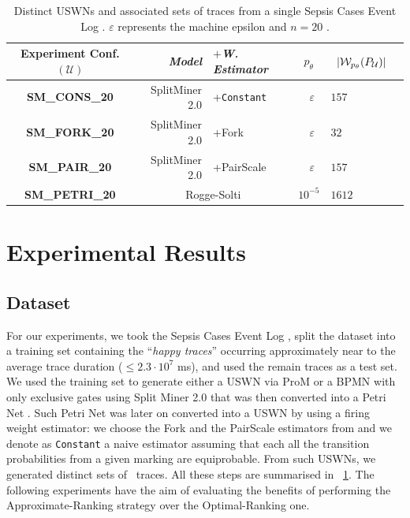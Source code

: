 \begin{table}[!t]
\caption{Distinct USWNs and associated sets of \unravelled traces from a single Sepsis Cases Event Log \cite{mannhardt_2016}. $\varepsilon$ represents the machine epsilon \ifdefined\WWITHN and $n=20$ \fi.}\label{tab:dataset}
 \begin{adjustbox}{max width=\textwidth}
	\begin{tabular}{crl||cl|c}
		\toprule
		\textbf{Experiment Conf.} $(\mathcal{U})$ & \textit{Model} & $+$\textit{W. Estimator} & $p_\theta$& $\;\;|\WCal{p_\theta}{n}(P_{\mathcal{U}})|$ \\
		\midrule
		
		\textbf{SM\_CONS\_20} &SplitMiner 2.0  \cite{AugustoCDRP19}       & +\texttt{Constant} &  $\;\;\varepsilon$ & $157$  \\
		
		\textbf{SM\_FORK\_20} & SplitMiner 2.0  \cite{AugustoCDRP19}      & +Fork \cite{spdwe} &  $\;\;\varepsilon$ & $32$  \\
		
		
		\textbf{SM\_PAIR\_20} & SplitMiner 2.0  \cite{AugustoCDRP19}      & +PairScale \cite{spdwe} &  $\;\;\varepsilon$ & $157$ \\
		
		\textbf{SM\_PETRI\_20} & \multicolumn{2}{c||}{Rogge-Solti \cite{RoggeSoltiAW13}} & $10^{-5}$ & $1612$ \\
		\bottomrule
	\end{tabular}
\end{adjustbox}
\end{table}
\section{Experimental Results}\label{sec:exp}
\subsection{Dataset}
For our experiments, we took the Sepsis Cases Event Log \cite{mannhardt_2016}, split the dataset into a training set containing the ``\textit{happy traces}'' occurring approximately near to the average trace duration ($\leq 2.3\cdot 10^{7}$ ms), \cite{RoggeSoltiAW13} and used the remain traces as a test set. We used the training set to generate either a USWN via ProM or a BPMN with only exclusive gates using Split Miner 2.0 \cite{AugustoCDRP19} that was then converted into a Petri Net \cite{PPNFromLog}. Such Petri Net was later on converted into a USWN by using a firing weight estimator: we choose the Fork and the PairScale estimators from \cite{spdwe} and we denote as \texttt{Constant} a naive estimator assuming that each all the transition probabilities from a given marking are equiprobable. %
From such USWNs, we generated distinct sets of \unravelled\ traces. All these steps are summarised in \tablename~\ref{tab:dataset}. The following experiments have the aim of evaluating the benefits of performing the Approximate-Ranking strategy over the Optimal-Ranking one.

